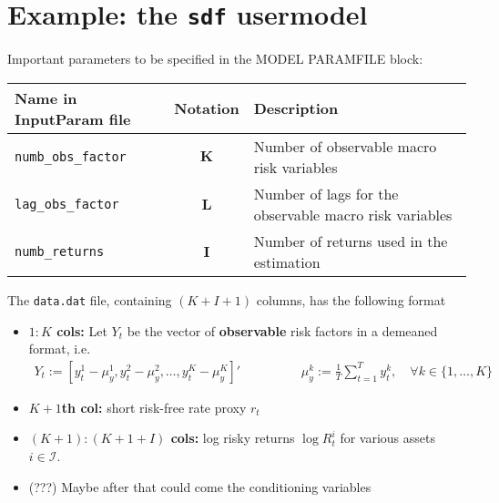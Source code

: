 \documentclass[11pt, letterpaper, notitlepage]{article}
\begin{document}
\begin{enumerate}
\begin{itemize}
\end{itemize}

\end{enumerate} 

\pagebreak


\section{Example: the \texttt{sdf} usermodel}

Important parameters to be specified in the MODEL PARAMFILE block:  
\begin{center}
\begin{tabular}{lcl}
Name in InputParam file & Notation & Description\\
\hline
\texttt{numb\_obs\_factor} &  $\mathbf{K}$ & Number of observable macro risk variables \\
\texttt{lag\_obs\_factor} &  $\mathbf{L}$ & Number of lags for the observable macro risk variables \\
\texttt{numb\_returns} & $\mathbf{I}$ & Number of returns used in the estimation
\end{tabular}
\end{center}


The \texttt{data.dat} file, containing $(K + I + 1)$ columns, has the following format
\begin{itemize}
\item \textbf{$1:K$ cols:} Let $Y_t$ be the vector of \textbf{observable} risk factors in a demeaned format, i.e.
\begin{align*}
Y_t := \left[ y_t^1 - \mu^1_y, y_t^2 - \mu^2_y, \dots, y_t^K - \mu^K_y \right]'\hspace{2cm} \mu_y^k := \frac{1}{T}\sum_{t=1}^{T} y^k_t,\quad \forall k\in\{1, \dots, K\}
\end{align*} 
\item \textbf{$K+1$th col:} short risk-free rate proxy $r_t$
\item \textbf{$(K+1):(K+1+I)$ cols:} log risky returns $\log R^i_t$ for various assets $i\in \mathcal{I}$.
\item[] (???) Maybe after that could come the conditioning variables
\end{itemize}
\end{document}
